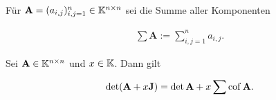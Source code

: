             Für $\mathbf A = (a_{i,j})_{i,j=1}^n \in \mathbb K^{n \times n}$ sei die Summe aller Komponenten

            \begin{align*}
                \sum \mathbf A
                :=
                \sum_{i,j=1}^n a_{i,j}.
            \end{align*}

            \begin{lemma} \label{lem:cofactor_sum}

                Sei $\mathbf A \in \mathbb K^{n \times n}$ und $x \in \mathbb K$.
                Dann gilt

                \begin{align*}
                    \det(\mathbf A + x \mathbf J)
                    =
                    \det \mathbf A + x \sum \operatorname{cof} \mathbf A.
                \end{align*}

            \end{lemma}

